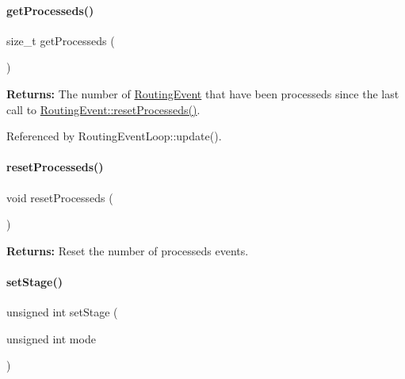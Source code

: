 \paragraph{\texorpdfstring{get\+Processeds()}{getProcesseds()}}
{\footnotesize\ttfamily size\+\_\+t get\+Processeds (\begin{DoxyParamCaption}{ }\end{DoxyParamCaption})\hspace{0.3cm}{\ttfamily [static]}}

{\bfseries Returns\+:} The number of \hyperlink{classKite_1_1RoutingEvent}{Routing\+Event} that have been processeds since the last call to \hyperlink{classKite_1_1RoutingEvent_a6cf10bb4e4488948e4c616c55a8e6514}{Routing\+Event\+::reset\+Processeds()}. 

Referenced by Routing\+Event\+Loop\+::update().

\mbox{\label{classKite_1_1RoutingEvent_a6cf10bb4e4488948e4c616c55a8e6514}} 
\paragraph{\texorpdfstring{reset\+Processeds()}{resetProcesseds()}}
{\footnotesize\ttfamily void reset\+Processeds (\begin{DoxyParamCaption}{ }\end{DoxyParamCaption})\hspace{0.3cm}{\ttfamily [static]}}

{\bfseries Returns\+:} Reset the number of processeds events. \mbox{\label{classKite_1_1RoutingEvent_a7300c33d439e453796b170eeaf4bf04d}} 
\paragraph{\texorpdfstring{set\+Stage()}{setStage()}}
{\footnotesize\ttfamily unsigned int set\+Stage (\begin{DoxyParamCaption}\item[{unsigned int}]{mode }\end{DoxyParamCaption})\hspace{0.3cm}{\ttfamily [static]}}

